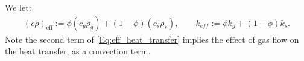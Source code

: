 We let:
\begin{equation} \label{Eq:eff_heat_transfer}
\begin{aligned}
(c\rho)_{\text{eff}}:=\phi(c_g\rho_g)+(1-\phi)(c_s\rho_s), \qquad
{k}_{eff}:=\phi {k}_g + (1-\phi){k}_s.
\end{aligned}
\end{equation}
Note the second term of \eqref{Eq:eff_heat_transfer} implies the effect of gas flow on the heat transfer, as a convection term.
%
